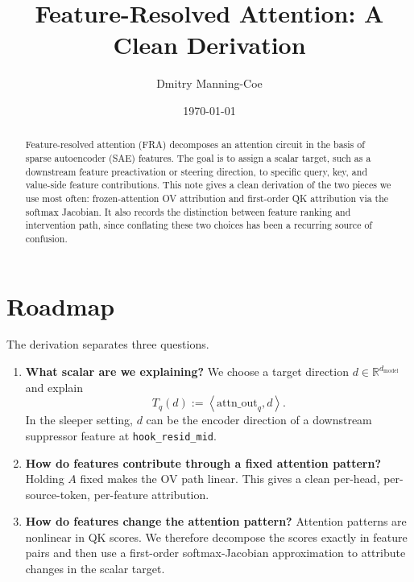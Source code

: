 \documentclass[11pt]{article}
\title{Feature-Resolved Attention: A Clean Derivation}
\author{Dmitry Manning-Coe}
\date{\today}
\newcommand{\R}{\mathbb{R}}
\newcommand{\ip}[2]{\left\langle #1, #2 \right\rangle}
\newcommand{\dm}{d_{\mathrm{model}}}
\newcommand{\hook}[1]{\texttt{#1}}
\newcommand{\attnout}{\mathrm{attn\_out}}
\theoremstyle{definition}
\theoremstyle{plain}
\theoremstyle{remark}
\begin{document}
\maketitle

\begin{abstract}
Feature-resolved attention (FRA) decomposes an attention circuit in the basis
of sparse autoencoder (SAE) features.  The goal is to assign a scalar target,
such as a downstream feature preactivation or steering direction, to specific
query, key, and value-side feature contributions.  This note gives a clean
derivation of the two pieces we use most often: frozen-attention OV attribution
and first-order QK attribution via the softmax Jacobian.  It also records the
distinction between feature ranking and intervention path, since conflating
these two choices has been a recurring source of confusion.
\end{abstract}

\tableofcontents

\section{Roadmap}

The derivation separates three questions.

\begin{enumerate}[leftmargin=*]
  \item \textbf{What scalar are we explaining?}
  We choose a target direction \(d \in \R^{\dm}\) and explain
  \[
    T_q(d) := \ip{\attnout_q}{d}.
  \]
  In the sleeper setting, \(d\) can be the encoder direction of a downstream
  suppressor feature at \hook{hook\_resid\_mid}.

  \item \textbf{How do features contribute through a fixed attention pattern?}
  Holding \(A\) fixed makes the OV path linear.  This gives a clean
  per-head, per-source-token, per-feature attribution.

  \item \textbf{How do features change the attention pattern?}
  Attention patterns are nonlinear in QK scores.  We therefore decompose the
  scores exactly in feature pairs and then use a first-order softmax-Jacobian
  approximation to attribute changes in the scalar target.
\end{enumerate}
\end{document}

